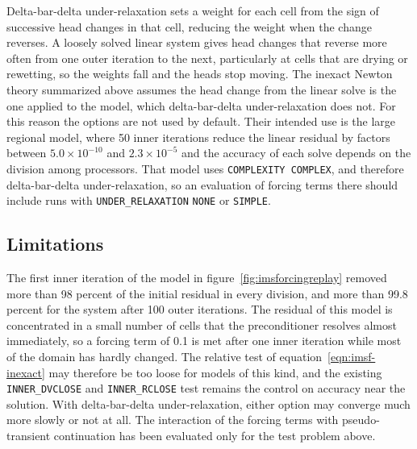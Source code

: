 Delta-bar-delta under-relaxation sets a weight for each cell from the sign of successive head changes in that cell, reducing the weight when the change reverses. A loosely solved linear system gives head changes that reverse more often from one outer iteration to the next, particularly at cells that are drying or rewetting, so the weights fall and the heads stop moving. The inexact Newton theory summarized above assumes the head change from the linear solve is the one applied to the model, which delta-bar-delta under-relaxation does not. For this reason the options are not used by default. Their intended use is the large regional model, where 50 inner iterations reduce the linear residual by factors between $5.0 \times 10^{-10}$ and $2.3 \times 10^{-5}$ and the accuracy of each solve depends on the division among processors. That model uses \texttt{COMPLEXITY COMPLEX}, and therefore delta-bar-delta under-relaxation, so an evaluation of forcing terms there should include runs with \texttt{UNDER\_RELAXATION} \texttt{NONE} or \texttt{SIMPLE}.

\subsection{Limitations}

The first inner iteration of the model in figure~\ref{fig:imsforcingreplay} removed more than 98 percent of the initial residual in every division, and more than 99.8 percent for the system after 100 outer iterations. The residual of this model is concentrated in a small number of cells that the preconditioner resolves almost immediately, so a forcing term of 0.1 is met after one inner iteration while most of the domain has hardly changed. The relative test of equation~\ref{eqn:imsf-inexact} may therefore be too loose for models of this kind, and the existing \texttt{INNER\_DVCLOSE} and \texttt{INNER\_RCLOSE} test remains the control on accuracy near the solution. With delta-bar-delta under-relaxation, either option may converge much more slowly or not at all. The interaction of the forcing terms with pseudo-transient continuation has been evaluated only for the test problem above.
